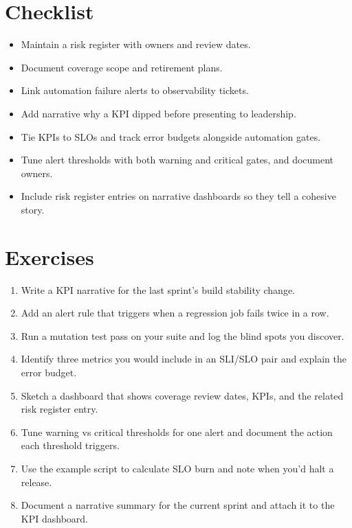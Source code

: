 \section{Checklist}

\begin{itemize}
  \item Maintain a risk register with owners and review dates.
  \item Document coverage scope and retirement plans.
  \item Link automation failure alerts to observability tickets.
  \item Add narrative why a KPI dipped before presenting to leadership.
  \item Tie KPIs to SLOs and track error budgets alongside automation gates.
  \item Tune alert thresholds with both warning and critical gates, and document owners.
  \item Include risk register entries on narrative dashboards so they tell a cohesive story.
\end{itemize}

\section{Exercises}

\begin{enumerate}
  \item Write a KPI narrative for the last sprint's build stability change.
  \item Add an alert rule that triggers when a regression job fails twice in a row.
  \item Run a mutation test pass on your suite and log the blind spots you discover.
  \item Identify three metrics you would include in an SLI/SLO pair and explain the error budget.
  \item Sketch a dashboard that shows coverage review dates, KPIs, and the related risk register entry.
  \item Tune warning vs critical thresholds for one alert and document the action each threshold triggers.
  \item Use the example script to calculate SLO burn and note when you'd halt a release.
  \item Document a narrative summary for the current sprint and attach it to the KPI dashboard.
\end{enumerate}

